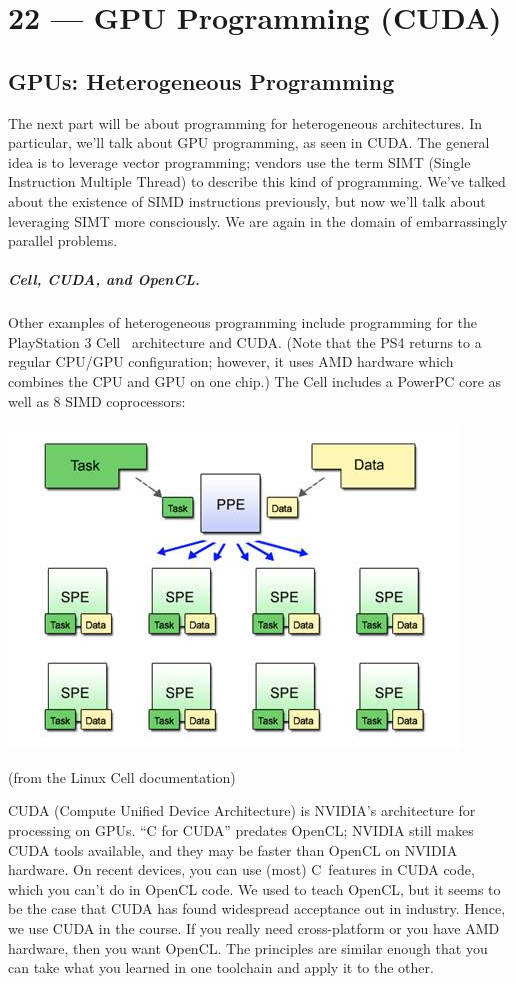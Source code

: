 \documentclass[a4paper]{report}
\newcommand{\CPP}{C\nolinebreak\hspace{-.05em}\raisebox{.4ex}{\tiny\bf +}\nolinebreak\hspace{-.10em}\raisebox{.4ex}{\tiny\bf +}}
\def\CPP{{C\nolinebreak[4]\hspace{-.05em}\raisebox{.4ex}{\tiny\bf ++}}}
\begin{document}
\chapter*{22 --- GPU Programming (CUDA)}


\section*{GPUs: Heterogeneous Programming}

The next part will be about programming for heterogeneous
architectures. In particular, we'll talk about GPU programming, as
seen in CUDA. The general idea is to
leverage vector programming; vendors use the term SIMT (Single
Instruction Multiple Thread) to describe this kind of
programming. We've talked about the existence of SIMD instructions
previously, but now we'll talk about leveraging SIMT more
consciously. We are again in the domain of embarrassingly parallel
problems.

\paragraph{Cell, CUDA, and OpenCL.} 
Other examples of heterogeneous programming include
programming for the PlayStation 3 Cell~\cite{cellprimer} architecture and CUDA. (Note that the PS4 returns to a regular CPU/GPU configuration; however, it uses AMD hardware which combines the CPU and GPU on one chip.) The Cell includes a PowerPC core as well as
8 SIMD coprocessors:

\begin{center}
\includegraphics[width=.4\textwidth]{images/cell.jpg}
\end{center}
\hfill (from the Linux Cell documentation)

CUDA (Compute Unified Device Architecture) is NVIDIA's architecture
for processing on GPUs. ``C for CUDA'' predates OpenCL; NVIDIA still
makes CUDA tools available, and they may be faster than OpenCL on NVIDIA
hardware. On recent devices, you can use (most) \CPP~features in CUDA code,
which you can't do in OpenCL code. We used to teach OpenCL, but it seems
to be the case that CUDA has found widespread acceptance out in industry.
Hence, we use CUDA in the course. If you really need cross-platform or 
you have AMD hardware, then you want OpenCL. The principles are similar 
enough that you can take what you learned in one toolchain and apply it 
to the other.
\end{document}
